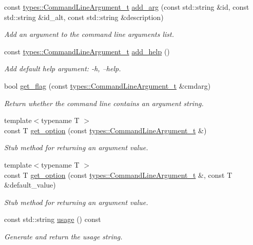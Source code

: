 \begin{DoxyCompactItemize}
const \hyperlink{structcppargparse_1_1types_1_1CommandLineArgument__t}{types\+::\+Command\+Line\+Argument\+\_\+t} \hyperlink{classcppargparse_1_1parser_1_1ArgumentParserBase_ad1bb9bf2be4793b3442679fa2090bc2d}{add\+\_\+arg} (const std\+::string \&id, const std\+::string \&id\+\_\+alt, const std\+::string \&description)
\begin{DoxyCompactList}\small\item\em Add an argument to the command line arguments list. \end{DoxyCompactList}\item 
const \hyperlink{structcppargparse_1_1types_1_1CommandLineArgument__t}{types\+::\+Command\+Line\+Argument\+\_\+t} \hyperlink{classcppargparse_1_1parser_1_1ArgumentParserBase_aaa2d68da1d224500fa290040de72ff01}{add\+\_\+help} ()
\begin{DoxyCompactList}\small\item\em Add default help argument\+: -\/h, --help. \end{DoxyCompactList}\item 
bool \hyperlink{classcppargparse_1_1parser_1_1ArgumentParserBase_aa95fba161ea60c65972e76025419b8d9}{get\+\_\+flag} (const \hyperlink{structcppargparse_1_1types_1_1CommandLineArgument__t}{types\+::\+Command\+Line\+Argument\+\_\+t} \&cmdarg)
\begin{DoxyCompactList}\small\item\em Return whether the command line contains an argument string. \end{DoxyCompactList}\item 
{\footnotesize template$<$typename T $>$ }\\const T \hyperlink{classcppargparse_1_1parser_1_1ArgumentParserBase_ae26532c710a553810a784d2243572e34}{get\+\_\+option} (const \hyperlink{structcppargparse_1_1types_1_1CommandLineArgument__t}{types\+::\+Command\+Line\+Argument\+\_\+t} \&)
\begin{DoxyCompactList}\small\item\em Stub method for returning an argument value. \end{DoxyCompactList}\item 
{\footnotesize template$<$typename T $>$ }\\const T \hyperlink{classcppargparse_1_1parser_1_1ArgumentParserBase_ae5f8dfec70ef927bc315e39046dcf63e}{get\+\_\+option} (const \hyperlink{structcppargparse_1_1types_1_1CommandLineArgument__t}{types\+::\+Command\+Line\+Argument\+\_\+t} \&, const T \&default\+\_\+value)
\begin{DoxyCompactList}\small\item\em Stub method for returning an argument value. \end{DoxyCompactList}\item 
const std\+::string \hyperlink{classcppargparse_1_1parser_1_1ArgumentParserBase_af99c2847a2cd19b1444dcb9ab2fb8103}{usage} () const
\begin{DoxyCompactList}\small\item\em Generate and return the usage string. \end{DoxyCompactList}\end{DoxyCompactItemize}
